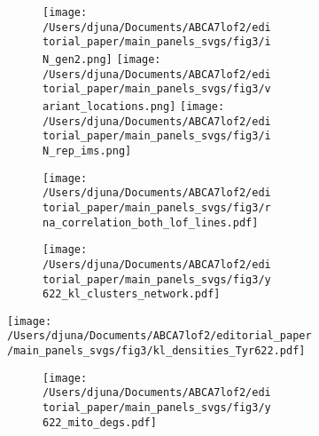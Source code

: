\documentclass[12pt]{article}
\begin{document}
\begin{figure}[H]
    \begin{subfigure}[t]{.24\textwidth}
        \begin{subfigure}[t]{\textwidth}
            \caption{}
            \texttt{[image: /Users/djuna/Documents/ABCA7lof2/editorial\_paper/main\_panels\_svgs/fig3/iN\_gen2.png]}        
            \texttt{[image: /Users/djuna/Documents/ABCA7lof2/editorial\_paper/main\_panels\_svgs/fig3/variant\_locations.png]}        
            \texttt{[image: /Users/djuna/Documents/ABCA7lof2/editorial\_paper/main\_panels\_svgs/fig3/iN\_rep\_ims.png]}        
        \end{subfigure} 
        \begin{subfigure}[t]{\textwidth}
            \caption{}
            \texttt{[image: /Users/djuna/Documents/ABCA7lof2/editorial\_paper/main\_panels\_svgs/fig3/rna\_correlation\_both\_lof\_lines.pdf]}        
        \end{subfigure} 
    \end{subfigure} 
    \begin{subfigure}[t]{.23\textwidth}
        \begin{subfigure}[t]{\textwidth}
            \caption{}
            \texttt{[image: /Users/djuna/Documents/ABCA7lof2/editorial\_paper/main\_panels\_svgs/fig3/y622\_kl\_clusters\_network.pdf]}        
        \end{subfigure}
    \end{subfigure} 
    \begin{subfigure}[t]{.45\textwidth}
        \caption{}
        \texttt{[image: /Users/djuna/Documents/ABCA7lof2/editorial\_paper/main\_panels\_svgs/fig3/kl\_densities\_Tyr622.pdf]}        
    \end{subfigure}  
    \begin{subfigure}[t]{.25\textwidth}
        \begin{subfigure}[t]{\textwidth}
            \caption{}
            \texttt{[image: /Users/djuna/Documents/ABCA7lof2/editorial\_paper/main\_panels\_svgs/fig3/y622\_mito\_degs.pdf]}        

\end{subfigure}
\end{subfigure}
\end{figure}
\end{document}
